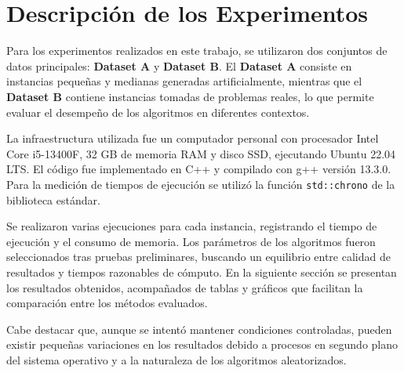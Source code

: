 \section*{Descripción de los Experimentos}

Para los experimentos realizados en este trabajo, se utilizaron dos conjuntos de datos principales: \textbf{Dataset A} y \textbf{Dataset B}. El \textbf{Dataset A} consiste en instancias pequeñas y medianas generadas artificialmente, mientras que el \textbf{Dataset B} contiene instancias tomadas de problemas reales, lo que permite evaluar el desempeño de los algoritmos en diferentes contextos.

La infraestructura utilizada fue un computador personal con procesador Intel Core i5-13400F, 32 GB de memoria RAM y disco SSD, ejecutando Ubuntu 22.04 LTS. El código fue implementado en C++ y compilado con g++ versión 13.3.0. Para la medición de tiempos de ejecución se utilizó la función \texttt{std::chrono} de la biblioteca estándar.

Se realizaron varias ejecuciones para cada instancia, registrando el tiempo de ejecución y el consumo de memoria. Los parámetros de los algoritmos fueron seleccionados tras pruebas preliminares, buscando un equilibrio entre calidad de resultados y tiempos razonables de cómputo. En la siguiente sección se presentan los resultados obtenidos, acompañados de tablas y gráficos que facilitan la comparación entre los métodos evaluados.

Cabe destacar que, aunque se intentó mantener condiciones controladas, pueden existir pequeñas variaciones en los resultados debido a procesos en segundo plano del sistema operativo y a la naturaleza de los algoritmos aleatorizados.
